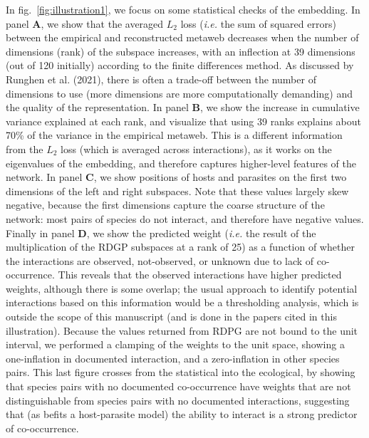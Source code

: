 \documentclass[10pt,oneside]{article}
\begin{document}
In fig.~\ref{fig:illustration1}, we focus on some statistical checks of
the embedding. In panel \textbf{A}, we show that the averaged \(L_2\)
loss (\emph{i.e.} the sum of squared errors) between the empirical and
reconstructed metaweb decreases when the number of dimensions (rank) of
the subspace increases, with an inflection at 39 dimensions (out of 120
initially) according to the finite differences method. As discussed by
Runghen et al. (2021), there is often a trade-off between the number of
dimensions to use (more dimensions are more computationally demanding)
and the quality of the representation. In panel \textbf{B}, we show the
increase in cumulative variance explained at each rank, and visualize
that using 39 ranks explains about 70\% of the variance in the empirical
metaweb. This is a different information from the \(L_2\) loss (which is
averaged across interactions), as it works on the eigenvalues of the
embedding, and therefore captures higher-level features of the network.
In panel \textbf{C}, we show positions of hosts and parasites on the
first two dimensions of the left and right subspaces. Note that these
values largely skew negative, because the first dimensions capture the
coarse structure of the network: most pairs of species do not interact,
and therefore have negative values. Finally in panel \textbf{D}, we show
the predicted weight (\emph{i.e.} the result of the multiplication of
the RDGP subspaces at a rank of 25) as a function of whether the
interactions are observed, not-observed, or unknown due to lack of
co-occurrence. This reveals that the observed interactions have higher
predicted weights, although there is some overlap; the usual approach to
identify potential interactions based on this information would be a
thresholding analysis, which is outside the scope of this manuscript
(and is done in the papers cited in this illustration). Because the
values returned from RDPG are not bound to the unit interval, we
performed a clamping of the weights to the unit space, showing a
one-inflation in documented interaction, and a zero-inflation in other
species pairs. This last figure crosses from the statistical into the
ecological, by showing that species pairs with no documented
co-occurrence have weights that are not distinguishable from species
pairs with no documented interactions, suggesting that (as befits a
host-parasite model) the ability to interact is a strong predictor of
co-occurrence.
\end{document}
